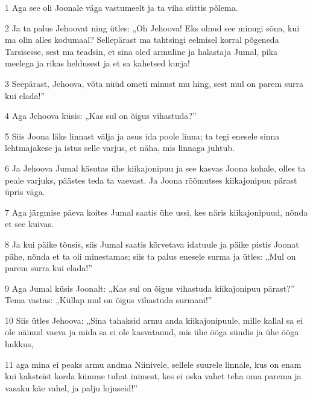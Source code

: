 \par 1 Aga see oli Joonale väga vastumeelt ja ta viha süttis põlema.
\par 2 Ja ta palus Jehoovat ning ütles: „Oh Jehoova! Eks olnud see minugi sõna, kui ma olin alles kodumaal? Sellepärast ma tahtsingi eelmisel korral põgeneda Tarsisesse, sest ma teadsin, et sina oled armuline ja halastaja Jumal, pika meelega ja rikas heldusest ja et sa kahetsed kurja!
\par 3 Seepärast, Jehoova, võta nüüd ometi minust mu hing, sest mul on parem surra kui elada!”
\par 4 Aga Jehoova küsis: „Kas sul on õigus vihastuda?”
\par 5 Siis Joona läks linnast välja ja asus ida poole linna; ta tegi enesele sinna lehtmajakese ja istus selle varjus, et näha, mis linnaga juhtub.
\par 6 Ja Jehoova Jumal käsutas ühe kiikajonipuu ja see kasvas Joona kohale, olles ta peale varjuks, päästes teda ta vaevast. Ja Joona rõõmutses kiikajonipuu pärast üpris väga.
\par 7 Aga järgmise päeva koites Jumal saatis ühe ussi, kes näris kiikajonipuud, nõnda et see kuivas.
\par 8 Ja kui päike tõusis, siis Jumal saatis kõrvetava idatuule ja päike pistis Joonat pähe, nõnda et ta oli minestamas; siis ta palus enesele surma ja ütles: „Mul on parem surra kui elada!”
\par 9 Aga Jumal küsis Joonalt: „Kas sul on õigus vihastuda kiikajonipuu pärast?” Tema vastas: „Küllap mul on õigus vihastuda surmani!”
\par 10 Siis ütles Jehoova: „Sina tahaksid armu anda kiikajonipuule, mille kallal sa ei ole näinud vaeva ja mida sa ei ole kasvatanud, mis ühe ööga sündis ja ühe ööga hukkus,
\par 11 aga mina ei peaks armu andma Niinivele, sellele suurele linnale, kus on enam kui kaksteist korda kümme tuhat inimest, kes ei oska vahet teha oma parema ja vasaku käe vahel, ja palju lojuseid!”




